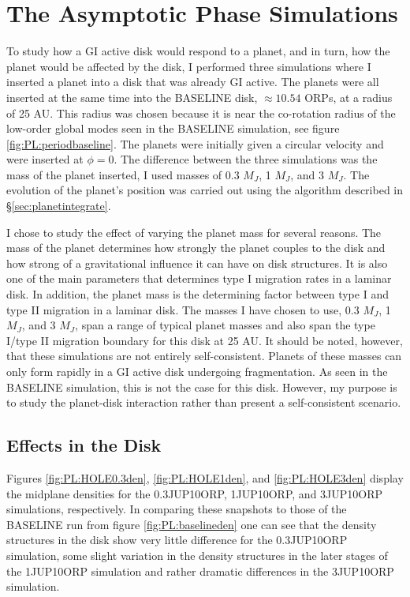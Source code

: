 \section{The Asymptotic Phase Simulations}\label{sec:PL:10ORP}

To study how a GI active disk would respond to a planet, and in turn, how the planet would be affected by the disk, I performed three simulations where I inserted a planet into a disk that was already GI active. The planets were all inserted at the same time into the BASELINE disk, $\approx 10.54$ ORPs, at a radius of 25 AU. This radius was chosen because it is near the co-rotation radius of the low-order global modes seen in the BASELINE simulation, see figure \ref{fig:PL:periodbaseline}. The planets were initially given a circular velocity and were inserted at $\phi = 0$. The difference between the three simulations was the mass of the planet inserted, I used masses of 0.3 $M_J$, 1 $M_J$, and 3 $M_J$. The evolution of the planet's position was carried out using the algorithm described in \S\ref{sec:planetintegrate}. 

I chose to study the effect of varying the planet mass for several reasons. The mass of the planet determines how strongly the planet couples to the disk and how strong of a gravitational influence it can have on disk structures. It is also one of the main parameters that determines type I migration rates in a laminar disk. In addition, the planet mass is the determining factor between type I and type II migration in a laminar disk. The masses I have chosen to use, 0.3 $M_J$, 1 $M_J$, and 3 $M_J$, span a range of typical planet masses and also span the type I/type II migration boundary for this disk at 25 AU. It should be noted, however, that these simulations are not entirely self-consistent. Planets of these masses can only form rapidly in a GI active disk undergoing fragmentation. As seen in the BASELINE simulation, this is not the case for this disk. However, my purpose is to study the planet-disk interaction rather than present a self-consistent scenario.

\subsection{Effects in the Disk}

Figures \ref{fig:PL:HOLE0.3den}, \ref{fig:PL:HOLE1den}, and \ref{fig:PL:HOLE3den} display the midplane densities for the 0.3JUP10ORP, 1JUP10ORP, and 3JUP10ORP simulations, respectively. In comparing these snapshots to those of the BASELINE run from figure \ref{fig:PL:baselineden} one can see that the density structures in the disk show very little difference for the 0.3JUP10ORP simulation, some slight variation in the density structures in the later stages of the 1JUP10ORP simulation and rather dramatic differences in the 3JUP10ORP simulation.

